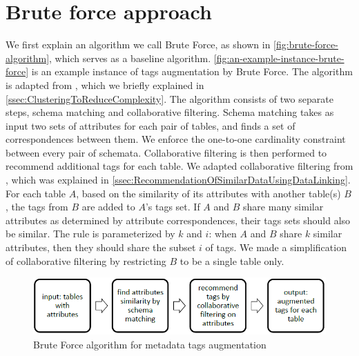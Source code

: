 
\section{Brute force approach}
\label{sec:BruteForceApproach}

We first explain an algorithm we call Brute Force, as shown in \autoref{fig:brute-force-algorithm}, which serves as a baseline algorithm. \autoref{fig:an-example-instance-brute-force} is an example instance of tags augmentation by Brute Force. The algorithm is adapted from \cite{Smith2011Unity}, which we briefly explained in \autoref{ssec:ClusteringToReduceComplexity}. The algorithm consists of two separate steps, schema matching and collaborative filtering. Schema matching takes as input two sets of attributes for each pair of tables, and finds a set of correspondences between them. We enforce the one-to-one cardinality constraint between every pair of schemata. Collaborative filtering is then performed to recommend additional tags for each table. We adapted collaborative filtering from \cite{conf/esws/EllefiBDT16}, which was explained in \autoref{ssec:RecommendationOfSimilarDataUsingDataLinking}. For each table $A$, based on the similarity of its attributes with another table(s) $B$, the tags from $B$ are added to $A$'s tags set. If $A$ and $B$ share many similar attributes as determined by attribute correspondences, their tags sets should also be similar. The rule is parameterized by $k$ and $i$: when $A$ and $B$ share $k$ similar attributes, then they should share the subset $i$ of tags. We made a simplification of collaborative filtering by restricting $B$ to be a single table only.

\begin{figure}
  \centering
  \includegraphics[width=5in]{figures/brute-force-algorithm.png}
  \caption{Brute Force algorithm for metadata tags augmentation}
  \label{fig:brute-force-algorithm}
\end{figure}

